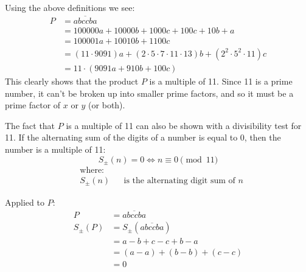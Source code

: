 \documentclass{article}
\begin{document}
Using the above definitions we see:
\[\begin{aligned}
    P &= \overline{abccba} \\
    &= 100000a + 10000b + 1000c + 100c + 10b + a \\
    &= 100001a + 10010b + 1100c \\
    &= (11\cdot9091)a + (2\cdot5\cdot7\cdot11\cdot13)b + (2^2\cdot5^2\cdot11)c \\
    &= 11\cdot(9091a + 910b + 100c)
\end{aligned}\]
This clearly shows that the product \(P\) is a multiple of 11. Since 11 is a prime number, it can't be broken up into smaller prime factors, and so it must be a prime factor of \(x\) or \(y\) (or both).

The fact that \(P\) is a multiple of 11 can also be shown with a divisibility test for 11. If the alternating sum of the digits of a number is equal to 0, then the number is a multiple of 11:
\[S_\pm(n) = 0 \iff n \equiv 0 \pmod{11} \]
\[ \begin{aligned}
    & \text{where:} \\
    & S_\pm(n) && \text{is the alternating digit sum of \(n\)}
\end{aligned} \]

Applied to \(P\):
\[\begin{aligned}
    P &= \overline{abccba} \\
    S_\pm(P) &= S_\pm(\overline{abccba}) \\
    &= a - b + c - c + b - a \\
    &= (a - a) + (b - b) + (c - c) \\
    &= 0
\end{aligned}\]
\end{document}
